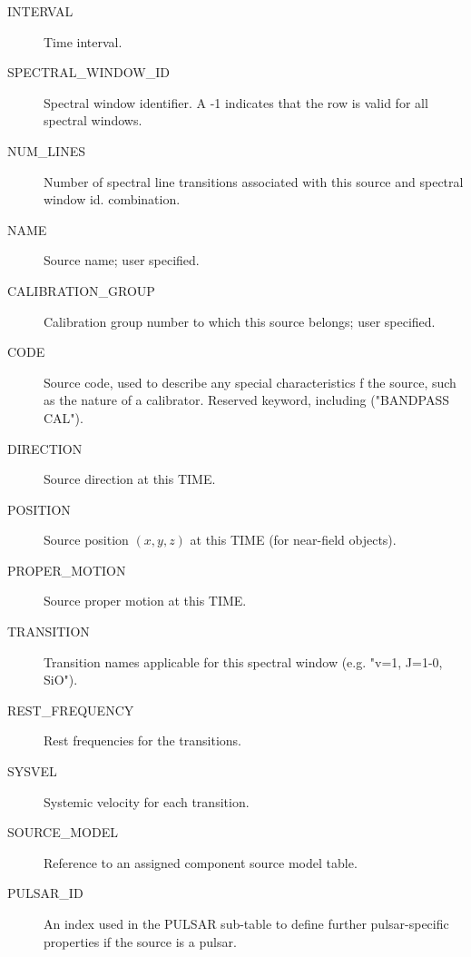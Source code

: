 \documentclass{article}
\begin{document}
\begin{itemize}
\begin{description}
\item[INTERVAL] Time interval.

\item[SPECTRAL\_WINDOW\_ID] Spectral window identifier. A -1 indicates
that the row is valid for all spectral windows.

\item[NUM\_LINES] Number of spectral line transitions associated with
this source and spectral window id. combination.

\item[NAME] Source name; user specified.

\item[CALIBRATION\_GROUP] Calibration group number to which this source
belongs; user specified.

\item[CODE] Source code, used to describe any special characteristics
f the source, such as the nature of a calibrator. Reserved keyword,
including ("BANDPASS CAL").

\item[DIRECTION] Source direction at this TIME.

\item[POSITION] Source position $(x,y,z)$ at this TIME (for near-field
objects).

\item[PROPER\_MOTION] Source proper motion at this TIME.

\item[TRANSITION] Transition names applicable for this spectral window
(e.g. "v=1, J=1-0, SiO").

\item[REST\_FREQUENCY] Rest frequencies for the transitions.

\item[SYSVEL] Systemic velocity for each transition.

\item[SOURCE\_MODEL] Reference to an assigned component source model
table.

\item[PULSAR\_ID] An index used in the PULSAR sub-table to define
further pulsar-specific properties if the source is a pulsar.

\end{description}


\end{itemize}
\end{document}
